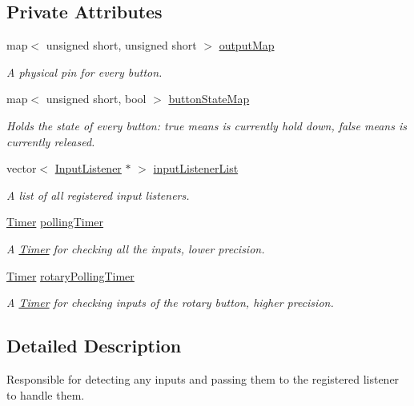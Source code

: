 \subsection*{Private Attributes}
\begin{DoxyCompactItemize}
\item 
map$<$ unsigned short, unsigned short $>$ \hyperlink{class_rasp_input_controller_a7b59eba5cc562eccc91347ddbd777e50}{output\+Map}
\begin{DoxyCompactList}\small\item\em A physical pin for every button. \end{DoxyCompactList}\item 
map$<$ unsigned short, bool $>$ \hyperlink{class_rasp_input_controller_ae02dcbb81abe6b6e6e3eaaeef4f3bf4a}{button\+State\+Map}
\begin{DoxyCompactList}\small\item\em Holds the state of every button\+: true means is currently hold down, false means is currently released. \end{DoxyCompactList}\item 
vector$<$ \hyperlink{class_input_listener}{Input\+Listener} $\ast$ $>$ \hyperlink{class_rasp_input_controller_a5a5a8d99d69c35e206ddf7467e36cfae}{input\+Listener\+List}
\begin{DoxyCompactList}\small\item\em A list of all registered input listeners. \end{DoxyCompactList}\item 
\hyperlink{class_timer}{Timer} \hyperlink{class_rasp_input_controller_a388779c1ddf9f5910a92cd350cc59e5c}{polling\+Timer}
\begin{DoxyCompactList}\small\item\em A \hyperlink{class_timer}{Timer} for checking all the inputs, lower precision. \end{DoxyCompactList}\item 
\hyperlink{class_timer}{Timer} \hyperlink{class_rasp_input_controller_a55b065ae154806341fd900a8b61110a5}{rotary\+Polling\+Timer}
\begin{DoxyCompactList}\small\item\em A \hyperlink{class_timer}{Timer} for checking inputs of the rotary button, higher precision. \end{DoxyCompactList}\end{DoxyCompactItemize}


\subsection{Detailed Description}
Responsible for detecting any inputs and passing them to the registered listener to handle them. 


